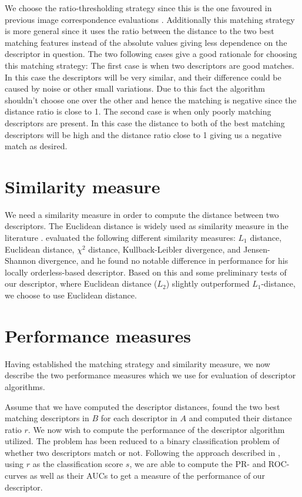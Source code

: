 \documentclass[thesis.tex]{subfiles}
\begin{document}
We choose the ratio-thresholding strategy since this is the one favoured in previous image correspondence evaluations \cite{mikolajczyk2005performance,dahl2011finding,larsen2012jet,lowe2004distinctive}. Additionally this matching strategy is more general since it uses the ratio between the distance to the two best matching features instead of the absolute values giving less dependence on the descriptor in question. The two following cases give a good rationale for choosing this matching strategy: The first case is when two descriptors are good matches. In this case the descriptors will be very similar, and their difference could be caused by noise or other small variations. Due to this fact the algorithm shouldn't choose one over the other and hence the matching is negative since the distance ratio is close to 1. The second case is when only poorly matching descriptors are present. In this case the distance to both of the best matching descriptors will be high and the distance ratio close to 1 giving us a negative match as desired.


\section{Similarity measure}
\label{sec:similarity_measure}
We need a similarity measure in order to compute the distance between two descriptors. The Euclidean distance is widely used as similarity measure in the literature \cite{lowe2004distinctive,ke2004pca,mikolajczyk2005performance}. \citet{larsen2012in} evaluated the following different similarity measures: $L_1$ distance, Euclidean distance, $\chi^2$ distance, Kullback-Leibler divergence, and Jensen-Shannon divergence, and he found no notable difference in performance for his locally orderless-based descriptor. Based on this and some preliminary tests of our descriptor, where Euclidean distance ($L_2$) slightly outperformed $L_1$-distance, we choose to use Euclidean distance.

\section{Performance measures}
\label{sec:performance_measures}

Having established the matching strategy and similarity measure, we now describe the two performance measures which we use for evaluation of descriptor algorithms.

Assume that we have computed the descriptor distances, found the two best matching descriptors in $B$ for each descriptor in $A$ and computed their distance ratio $r$. We now wish to compute the performance of the descriptor algorithm utilized. The problem has been reduced to a binary classification problem of whether two descriptors match or not. Following the approach described in , using $r$ as the classification score $s$, we are able to compute the PR- and ROC-curves as well as their AUCs to get a measure of the performance of our descriptor.
\end{document}
